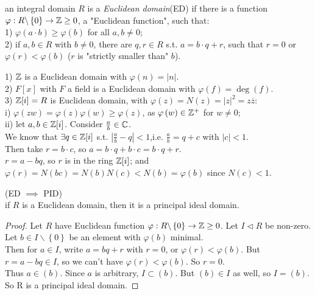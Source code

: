 \documentclass[a4paper]{article}
\begin{document}
\begin{defi}
an integral domain $R$ is a \emph{Euclidean domain}(ED) if there is a function $\varphi: R \backslash \left\{0\right\}\to \mathbb{Z}\geq 0$, a "Euclidean function", such that:\\
1) $\varphi \left(a\cdot b\right) \geq \varphi\left(b\right)$ for all $a,b\neq 0$;\\
2) if $a,b\in R$ with $b\neq 0$, there are $q,r\in R$ s.t. $a=b\cdot q+r$, such that $r=0$ or $\varphi\left(r\right)<\varphi\left(b\right)$ ($r$ is "strictly smaller than" $b$).
\end{defi}

\begin{eg}
1) $\mathbb{Z}$ is a Euclidean domain with $\varphi\left(n\right)=|n|$.\\
2) $F[x]$ with $F$ a field is a Euclidean domain with $\varphi\left(f\right)=\deg\left(f\right)$.\\
3) $\mathbb{Z}[i]=R$ is Euclidean domain, with $\varphi\left(z\right)=N\left(z\right)=|z|^2=z\overline{z}$:\\
	i) $\varphi\left(zw\right)=\varphi\left(z\right)\varphi\left(w\right) \geq \varphi\left(z\right)$, as $\varphi\left(w\right)\in \mathbb{Z}^+$ for $w\neq 0$;\\
	ii) let $a,b\in\mathbb{Z}[i]$. Consider $\frac{a}{b}\in\mathbb{C}$.\\
		We know that $\exists q\in\mathbb{Z}[i]$ s.t. $|\frac{a}{b}-q|<1$,i.e. $\frac{a}{b}=q+c$ with $|c|<1$.\\
		Then take $r=b\cdot c$, so $a=b\cdot q + b\cdot c = b\cdot q+r$.\\
		$r=a-bq$, so $r$ is in the ring $\mathbb{Z}[i]$; and $\varphi\left(r\right)=N\left(bc\right)=N\left(b\right)N\left(c\right)<N\left(b\right)=\varphi\left(b\right)$ since $N\left(c\right)<1$.
\end{eg}

\begin{prop} (ED $\implies$ PID)\\
if $R$ is a Euclidean domain, then it is a principal ideal domain.
\begin{proof}
Let $R$ have Euclidean function $\varphi:R\backslash\left\{0\right\}\to\mathbb{Z}\geq 0$. Let $I\triangleleft R$ be non-zero. Let $b\in I\backslash\left\{0\right\}$ be an element with $\varphi\left(b\right)$ minimal.\\
Then for $a\in I$, write $a=bq+r$ with $r=0$, or $\varphi\left(r\right)<\varphi\left(b\right)$. But $r=a-bq\in I$, so we can't have $\varphi\left(r\right)<\varphi\left(b\right)$. So $r=0$.\\
Thus $a\in\left(b\right)$. Since $a$ is arbitrary, $I \subset \left(b\right)$. But $\left(b\right)\in I$ as well, so $I=\left(b\right)$. So R is a principal ideal domain.
\end{proof}
\end{prop}
\end{document}
